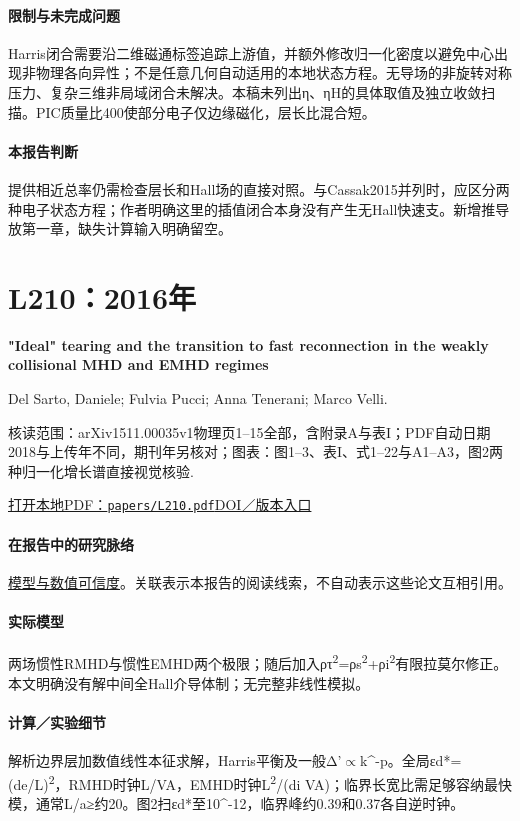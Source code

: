 \paragraph{限制与未完成问题}Harris闭合需要沿二维磁通标签追踪上游值，并额外修改归一化密度以避免中心出现非物理各向异性；不是任意几何自动适用的本地状态方程。无导场的非旋转对称压力、复杂三维非局域闭合未解决。本稿未列出η、ηH的具体取值及独立收敛扫描。PIC质量比400使部分电子仅边缘磁化，层长比混合短。

\paragraph{本报告判断}提供相近总率仍需检查层长和Hall场的直接对照。与Cassak2015并列时，应区分两种电子状态方程；作者明确这里的插值闭合本身没有产生无Hall快速支。新增推导放第一章，缺失计算输入明确留空。

\section{L210：2016年}\label{paper:L210}

\textbf{"Ideal" tearing and the transition to fast reconnection in the weakly collisional MHD and EMHD regimes}\citep{L210}\

Del Sarto,  Daniele;  Fulvia Pucci;  Anna Tenerani;  Marco Velli.

\textsf{核读范围：}arXiv1511.00035v1物理页1–15全部，含附录A与表I；PDF自动日期2018与上传年不同，期刊年另核对；\textsf{图表：}图1–3、表I、式1–22与A1–A3，图2两种归一化增长谱直接视觉核验.

\href{run:papers/L210.pdf}{打开本地PDF：\texttt{papers/L210.pdf}}\quad\href{https://doi.org/10.1002/2015ja021975}{DOI／版本入口}

\paragraph{在报告中的研究脉络}\hyperref[ch:numerics]{模型与数值可信度}。关联表示本报告的阅读线索，不自动表示这些论文互相引用。

\paragraph{实际模型}两场惯性RMHD与惯性EMHD两个极限；随后加入ρτ\textsuperscript{2}=ρs\textsuperscript{2}+ρi\textsuperscript{2}有限拉莫尔修正。本文明确没有解中间全Hall介导体制；无完整非线性模拟。

\paragraph{计算／实验细节}解析边界层加数值线性本征求解，Harris平衡及一般Δ'\ensuremath{\propto}k\textasciicircum{}-p。全局εd*=(de/L)\textsuperscript{2}，RMHD时钟L/VA，EMHD时钟L\textsuperscript{2}/(di VA)；临界长宽比需足够容纳最快模，通常L/a≥约20。图2扫εd*至10\textasciicircum{}-12，临界峰约0.39和0.37各自逆时钟。


